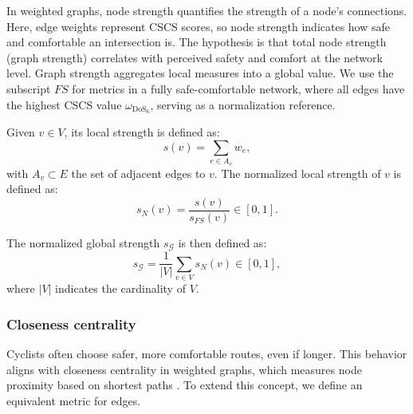 \documentclass[lettersize,journal]{IEEEtran}
\begin{document}
In weighted graphs, node strength quantifies the strength of a node's connections. Here, edge weights represent CSCS scores, so node strength indicates how safe and comfortable an intersection is. The hypothesis is that total node strength (graph strength) correlates with perceived safety and comfort at the network level. Graph strength aggregates local measures into a global value. We use the subscript $FS$ for metrics in a fully safe-comfortable network, where all edges have the highest CSCS value $\omega_{\text{DoS}_6}$, serving as a normalization reference.

Given $v \in V$, its local strength is defined as:
\begin{equation} \nonumber
    s(v) = \sum_{e \in A_{v}} w_{e},
\end{equation}
with $A_{v} \subset E$ the set of adjacent edges to $v$. The normalized local strength of $v$ is defined as:
\begin{equation} \nonumber
    s_N(v) = \frac{s(v)}{ s_{FS}(v)} \in \left [ 0,1 \right].
\end{equation}


The normalized global strength $s_{\mathcal{G}} $ is then defined as:
\begin{equation} \nonumber
    s_{\mathcal{G}} = \frac{1}{|V|} \sum_{v \in V} s_{N}(v)\in \left [ 0,1 \right],
\end{equation}
where $|V|$ indicates the cardinality of $V$.

\subsubsection{Closeness centrality}
\label{closenness_metric}
Cyclists often choose safer, more comfortable routes, even if longer. This behavior aligns with closeness centrality in weighted graphs, which measures node proximity based on shortest paths \cite{dijkstra2022note}. To extend this concept, we define an equivalent metric for edges.
\end{document}
